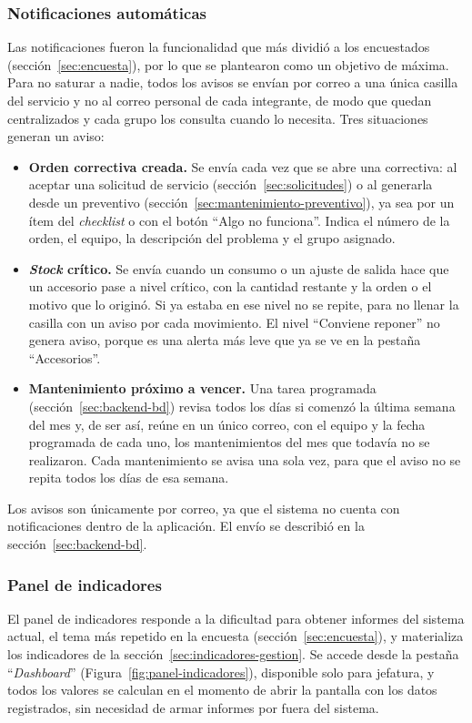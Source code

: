 \documentclass[10pt]{article}
\begin{document}
\subsubsection{Notificaciones automáticas}
\label{sec:notificaciones}
Las notificaciones fueron la funcionalidad que más dividió a los encuestados (sección~\ref{sec:encuesta}), por lo que se plantearon como un objetivo de máxima. Para no saturar a nadie, todos los avisos se envían por correo a una única casilla del servicio y no al correo personal de cada integrante, de modo que quedan centralizados y cada grupo los consulta cuando lo necesita. Tres situaciones generan un aviso:
\begin{itemize}
\item \textbf{Orden correctiva creada.} Se envía cada vez que se abre una correctiva: al aceptar una solicitud de servicio (sección~\ref{sec:solicitudes}) o al generarla desde un preventivo (sección~\ref{sec:mantenimiento-preventivo}), ya sea por un ítem del \textit{checklist} o con el botón “Algo no funciona”. Indica el número de la orden, el equipo, la descripción del problema y el grupo asignado. 
\item \textbf{\textit{Stock} crítico.} Se envía cuando un consumo o un ajuste de salida hace que un accesorio pase a nivel crítico, con la cantidad restante y la orden o el motivo que lo originó. Si ya estaba en ese nivel no se repite, para no llenar la casilla con un aviso por cada movimiento. El nivel “Conviene reponer” no genera aviso, porque es una alerta más leve que ya se ve en la pestaña “Accesorios”. 
\item \textbf{Mantenimiento próximo a vencer.} Una tarea programada (sección~\ref{sec:backend-bd}) revisa todos los días si comenzó la última semana del mes y, de ser así, reúne en un único correo, con el equipo y la fecha programada de cada uno, los mantenimientos del mes que todavía no se realizaron. Cada mantenimiento se avisa una sola vez, para que el aviso no se repita todos los días de esa semana.
\end{itemize}

Los avisos son únicamente por correo, ya que el sistema no cuenta con notificaciones dentro de la aplicación. El envío se describió en la sección~\ref{sec:backend-bd}.

\subsubsection{Panel de indicadores}
\label{sec:panel-indicadores}
El panel de indicadores responde a la dificultad para obtener informes del sistema actual, el tema más repetido en la encuesta (sección~\ref{sec:encuesta}), y materializa los indicadores de la sección~\ref{sec:indicadores-gestion}. Se accede desde la pestaña “\textit{Dashboard}” (Figura~\ref{fig:panel-indicadores}), disponible solo para jefatura, y todos los valores se calculan en el momento de abrir la pantalla con los datos registrados, sin necesidad de armar informes por fuera del sistema.
\end{document}

